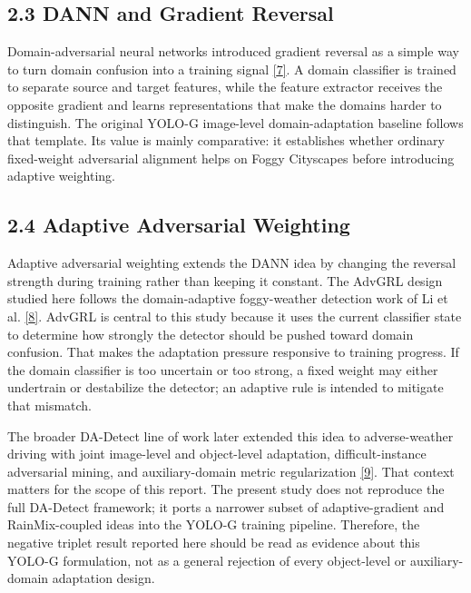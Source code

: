\documentclass[
  11pt,
]{article}
\begin{document}
\hypertarget{dann-and-gradient-reversal}{%
\subsection{2.3 DANN and Gradient
Reversal}\label{dann-and-gradient-reversal}}

Domain-adversarial neural networks introduced gradient reversal as a
simple way to turn domain confusion into a training signal
\protect\hyperlink{ref-ganin2016dann}{{[}7{]}}. A domain classifier is
trained to separate source and target features, while the feature
extractor receives the opposite gradient and learns representations that
make the domains harder to distinguish. The original YOLO-G image-level
domain-adaptation baseline follows that template. Its value is mainly
comparative: it establishes whether ordinary fixed-weight adversarial
alignment helps on Foggy Cityscapes before introducing adaptive
weighting.

\hypertarget{adaptive-adversarial-weighting}{%
\subsection{2.4 Adaptive Adversarial
Weighting}\label{adaptive-adversarial-weighting}}

Adaptive adversarial weighting extends the DANN idea by changing the
reversal strength during training rather than keeping it constant. The
AdvGRL design studied here follows the domain-adaptive foggy-weather
detection work of Li et al.
\protect\hyperlink{ref-li2022domainadaptivefoggy}{{[}8{]}}. AdvGRL is
central to this study because it uses the current classifier state to
determine how strongly the detector should be pushed toward domain
confusion. That makes the adaptation pressure responsive to training
progress. If the domain classifier is too uncertain or too strong, a
fixed weight may either undertrain or destabilize the detector; an
adaptive rule is intended to mitigate that mismatch.

The broader DA-Detect line of work later extended this idea to
adverse-weather driving with joint image-level and object-level
adaptation, difficult-instance adversarial mining, and auxiliary-domain
metric regularization \protect\hyperlink{ref-li2024dadetect}{{[}9{]}}.
That context matters for the scope of this report. The present study
does not reproduce the full DA-Detect framework; it ports a narrower
subset of adaptive-gradient and RainMix-coupled ideas into the YOLO-G
training pipeline. Therefore, the negative triplet result reported here
should be read as evidence about this YOLO-G formulation, not as a
general rejection of every object-level or auxiliary-domain adaptation
design.
\end{document}
